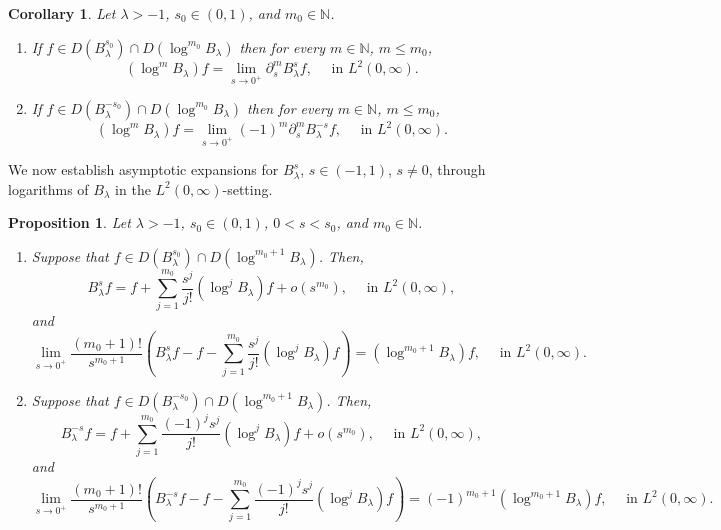 \documentclass[a4paper,10pt, reqno]{amsart}
\newtheorem{cor}[thm]{Corollary}
\newtheorem{prop}[thm]{Proposition}
\theoremstyle{definition}
\theoremstyle{remark}
\numberwithin{equation}{section}
\begin{document}
\begin{cor}\label{cor: Cor2.5}
    Let $\lambda >-1$, $s_0\in (0,1)$, and $m_0\in \mathbb N$.
\begin{enumerate} 
    \item If $f\in D(B_\lambda^{s_0})\cap D(\log^{m_0}B_\lambda)$ then for every $m\in \mathbb N$, $m\leq m_0$,
\[
(\log^m B_\lambda)f=\lim_{s\rightarrow 0^+}\partial_s^m B_\lambda^sf,\quad \mbox{ in }L^2(0,\infty).
\]
\item If $f\in D(B_\lambda^{-s_0})\cap D(\log^{m_0}B_\lambda)$ then for every $m\in \mathbb N$, $m\leq m_0$,
\[
(\log^m B_\lambda)f=\lim_{s\rightarrow 0^+}(-1)^m\partial_s^m B_\lambda^{-s}f,\quad \mbox{ in }L^2(0,\infty).
\]
\end{enumerate}
\end{cor}
We now establish asymptotic expansions for $B_\lambda^s$, $s\in (-1,1)$, $s\neq 0$, through logarithms of $B_\lambda$ in the $L^2(0,\infty)$-setting.

\begin{prop}\label{prop: Prop2.5}
  Let $\lambda >-1$, $s_0\in (0,1)$, $0<s<s_0$, and $m_0\in \mathbb N$.
  \begin{enumerate}
      \item \label{itm: Prop2.5 a} Suppose that $f\in D(B_\lambda^{s_0})\cap D(\log^{m_0+1}B_\lambda)$. Then,
      \[
      B_\lambda^s f=f+\sum_{j=1}^{m_0}\frac{s^j}{j!}(\log^jB_\lambda)f+o(s^{m_0}),\quad \mbox{ in }L^2(0,\infty),
      \]
      and
      \[
      \lim_{s\rightarrow 0^+}\frac{(m_0+1)!}{s^{m_0+1}}\left(B_\lambda^sf-f-\sum_{j=1}^{m_0}\frac{s^j}{j!}(\log^jB_\lambda)f\right)=(\log^{m_0+1}B_\lambda)f,\quad \mbox{ in }L^2(0,\infty).
      \]
      \item \label{itm: Prop2.5 b} Suppose that $f\in D(B_\lambda^{-s_0})\cap D(\log^{m_0+1}B_\lambda)$. Then,
      \[
      B_\lambda^{-s}f=f+\sum_{j=1}^{m_0}\frac{(-1)^js^j}{j!}(\log^jB_\lambda)f+o(s^{m_0}),\quad \mbox{ in }L^2(0,\infty),
      \]
      and
      \[
      \lim_{s\rightarrow 0^+}\frac{(m_0+1)!}{s^{m_0+1}}\left(B_\lambda^{-s}f-f-\sum_{j=1}^{m_0}\frac{(-1)^js^j}{j!}(\log^jB_\lambda)f\right)=(-1)^{m_0+1}(\log^{m_0+1}B_\lambda)f,\quad \mbox{ in }L^2(0,\infty).
      \]
  \end{enumerate}
\end{prop}
\end{document}
